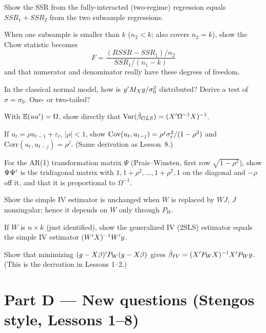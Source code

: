 \documentclass[11pt]{article}
\begin{document}
  Show the SSR from the
fully-interacted (two-regime) regression equals $SSR_{1} + SSR_{2}$ from the two
subsample regressions.

  When one subsample
is smaller than $k$ ($n_{2} < k$; also covers $n_{2} = k$), show the Chow statistic becomes
\[
  F = \frac{(RSSR - SSR_{1})/n_{2}}{SSR_{1}/(n_{1} - k)}
\]
and that numerator and denominator really have these degrees of freedom.

 In the classical normal model, how is $y^{\prime} M_{X}y/\sigma_{0}^{2}$
distributed? Derive a test of $\sigma = \sigma_{0}$. One- or two-tailed?


 With $\mathbb{E}(uu^{\prime}) = \Omega$, show directly that
$\operatorname{Var}(\hat\beta_{GLS}) = (X^{\prime}\Omega^{-1}X)^{-1}$.

 If $u_{t} = \rho u_{t-1} + \varepsilon_{t}$, $|\rho| < 1$, show
$\operatorname{Cov}(u_{t},u_{t-j}) = \rho^{j}\sigma_{\varepsilon}^{2}/(1-\rho^{2})$ and
$\mathrm{Corr}(u_{t},u_{t-j}) = \rho^{j}$. (Same derivation as Lesson~8.)

 For the AR(1) transformation matrix $\Psi$ (Prais--Winsten,
first row $\sqrt{1-\rho^{2}}$), show $\Psi\Psi^{\prime}$ is the tridiagonal matrix with
$1, 1+\rho^{2},\dots,1+\rho^{2}, 1$ on the diagonal and $-\rho$ off it, and that it is
proportional to $\Omega^{-1}$.


 Show the simple IV estimator is unchanged when $W$ is replaced by
$WJ$, $J$ nonsingular; hence it depends on $W$ only through $P_{W}$.

 If $W$ is $n \times k$ (just identified), show the generalized IV
(2SLS) estimator equals the simple IV estimator $(W^{\prime} X)^{-1}W^{\prime} y$.

 Show that minimizing $(y - X\beta)^{\prime} P_{W}(y - X\beta)$ gives
$\hat\beta_{IV} = (X^{\prime} P_{W}X)^{-1}X^{\prime} P_{W}y$. (This is the derivation in Lessons 1--2.)

\section{Part D --- New questions (Stengos style, Lessons 1--8)}
\end{document}

